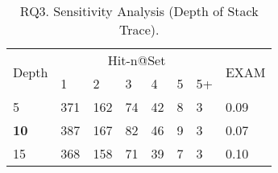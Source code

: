 
\begin{table}[t]
	\caption{RQ3. Sensitivity Analysis (Depth of Stack Trace).}
        \vspace{-6pt}
	{\footnotesize
		\begin{center}
			\renewcommand{\arraystretch}{1}
			\begin{tabular}{p{1cm}|p{0.3cm}<{\centering}|p{0.3cm}<{\centering}|p{0.3cm}<{\centering}|p{0.3cm}<{\centering}|p{0.3cm}<{\centering}|p{0.3cm}<{\centering}|p{0.7cm}<{\centering}}
				\hline
				\multirow{2}{*}{Depth}    & \multicolumn{6}{c|}{Hit-n@Set}& \multirow{2}{*}{EXAM}\\
				\cline{2-7}
				&1&2&3&4&5&5+&\\
				
				\hline 
				5 			                & 371 & 162 & 74  & 42 & 8 & 3   & 0.09\\
			{\bf	10}                         & 387 & 167 & 82  & 46 & 9 & 3   & 0.07\\
				15	                        & 368 & 158 & 71  & 39 & 7 & 3   & 0.10\\
				\hline
			\end{tabular}
			
			\label{fig:rq3-2}
		\end{center}
	}
\end{table}


